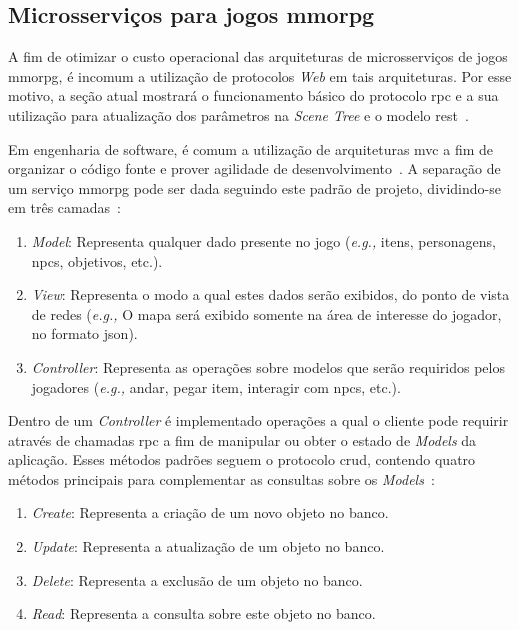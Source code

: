 \subsection{Microsserviços para jogos \ac{mmorpg}}
\label{sec:arquiteturas}



A fim de otimizar o custo operacional das arquiteturas de microsserviços de jogos \ac{mmorpg}, é incomum a utilização de protocolos \textit{Web} em tais arquiteturas.
%
Por esse motivo, a seção atual mostrará o funcionamento básico do protocolo \ac{rpc} e a sua utilização para atualização dos parâmetros na \textit{Scene Tree} e o modelo \ac{rest}~\cite{albion_online_unite}.



Em engenharia de software, é comum a utilização de arquiteturas \ac{mvc} a fim de organizar o código fonte e prover agilidade de desenvolvimento~\cite{Chadwick2012Oct, LeckyThompson2008Nov}.
%
A separação de um serviço \ac{mmorpg} pode ser dada seguindo este padrão de projeto, dividindo-se em três camadas~\cite{5718337}:


\begin{enumerate}
  \item \textit{Model}: Representa qualquer dado presente no jogo (\textit{e.g.,} itens, personagens, \acp{npc}, objetivos, etc.).
  \item \textit{View}: Representa o modo a qual estes dados serão exibidos, do ponto de vista de redes (\textit{e.g.,} O mapa será exibido somente na área de interesse do jogador, no formato \ac{json}).
  \item \textit{Controller}: Representa as operações sobre modelos que serão requiridos pelos jogadores (\textit{e.g.,} andar, pegar item, interagir com \acp{npc}, etc.).
\end{enumerate}



Dentro de um \textit{Controller} é implementado operações a qual o cliente pode requirir através de chamadas \ac{rpc} a fim de manipular ou obter o estado de \textit{Models} da aplicação.
%
Esses métodos padrões seguem o protocolo \ac{crud}, contendo quatro métodos principais para complementar as consultas sobre os \textit{Models}~\cite{Chadwick2012Oct, LeckyThompson2008Nov}:



\begin{enumerate}
  \item \textit{Create}: Representa a criação de um novo objeto no banco.
  \item \textit{Update}: Representa a atualização de um objeto no banco.
  \item \textit{Delete}: Representa a exclusão de um objeto no banco.
  \item \textit{Read}: Representa a consulta sobre este objeto no banco.
\end{enumerate}



